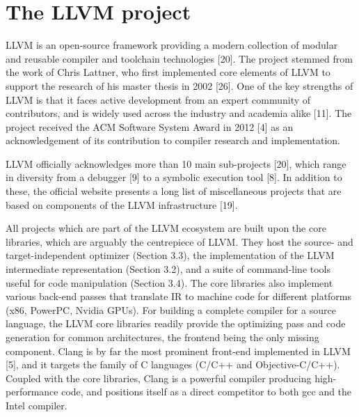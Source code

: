 \newpage

\section{The LLVM project}

LLVM is an open-source framework providing a modern collection of modular and reusable
compiler and toolchain technologies [20]. The project stemmed from the work of Chris
Lattner, who first implemented core elements of LLVM to support the research of his
master thesis in 2002 [26]. One of the key strengths of LLVM is that it faces active
development from an expert community of contributors, and is widely used across the
industry and academia alike [11]. The project received the ACM Software System Award
in 2012 [4] as an acknowledgement of its contribution to compiler research and implementation.

LLVM officially acknowledges more than 10 main sub-projects [20], which range in diversity from a debugger [9] to a symbolic execution tool [8]. In addition to these, the official
website presents a long list of miscellaneous projects that are based on components of
the LLVM infrastructure [19].

All projects which are part of the LLVM ecosystem are built upon the core libraries, which
are arguably the centrepiece of LLVM. They host the source- and target-independent
optimizer (Section 3.3), the implementation of the LLVM intermediate representation
(Section 3.2), and a suite of command-line tools useful for code manipulation (Section 3.4).
The core libraries also implement various back-end passes that translate IR to machine
code for different platforms (x86, PowerPC, Nvidia GPUs).
For building a complete compiler for a source language, the LLVM core libraries readily
provide the optimizing pass and code generation for common architectures, the frontend being the only missing component. Clang is by far the most prominent front-end
implemented in LLVM [5], and it targets the family of C languages (C/C++ and Objective-C/C++). Coupled with the core libraries, Clang is a powerful compiler
producing high-performance code, and positions itself as a direct competitor to both gcc
and the Intel compiler.

